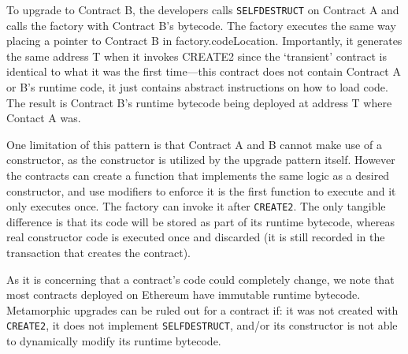 To upgrade to Contract B, the developers calls \texttt{SELFDESTRUCT} on Contract A and calls the factory with Contract B's bytecode. The factory executes the same way placing a pointer to Contract B in factory.codeLocation. Importantly, it generates the same address T when it invokes CREATE2 since the `transient' contract is identical to what it was the first time---this contract does not contain Contract A or B's runtime code, it just contains abstract instructions on how to load code. The result is Contract B's runtime bytecode being deployed at address T where Contact A was. 
 
One limitation of this pattern is that Contract A and B cannot make use of a constructor, as the constructor is utilized by the upgrade pattern itself. However the contracts can create a function that implements the same logic as a desired constructor, and use modifiers to enforce it is the first function to execute and it only executes once. The factory can invoke it after \texttt{CREATE2}. The only tangible difference is that its code will be stored as part of its runtime bytecode, whereas real constructor code is executed once and discarded (it is still recorded in the transaction that creates the contract). 

As it is concerning that a contract's code could completely change, we note that most contracts deployed on Ethereum have immutable runtime bytecode. Metamorphic upgrades can be ruled out for a contract if: it was not created with \texttt{CREATE2}, it does not implement \texttt{SELFDESTRUCT}, and/or its constructor is not able to dynamically modify its runtime bytecode. 



